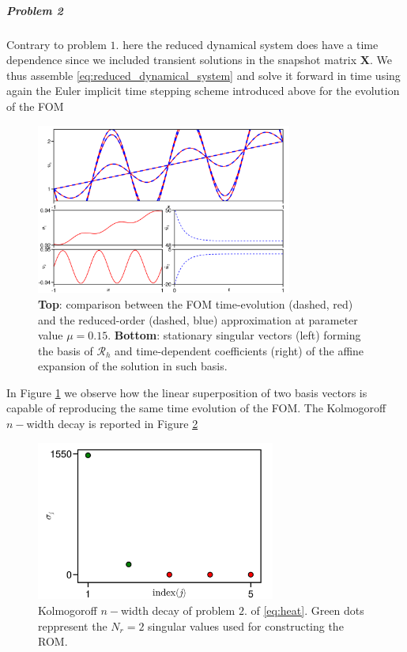 \documentclass[../main.tex]{subfiles}
\begin{document}
\subparagraph{Problem 2}\label{subpar:problem2_rom}

Contrary to problem $1.$ here the reduced dynamical system does have a time dependence since we included transient solutions in the snapshot matrix $\boldsymbol{X}$.
We thus assemble \eqref{eq:reduced_dynamical_system} and solve it forward in time using again the Euler implicit time stepping scheme introduced above for the evolution of the FOM

\begin{figure}[H]
    \centering 
    \includegraphics[keepaspectratio, width=0.75\textwidth]{../figures/fig:problem2_rom.png}
    \caption{\textbf{Top}: comparison between the FOM time-evolution (dashed, red) and the reduced-order (dashed, blue) approximation at parameter value $\mu=0.15$.
    \textbf{Bottom}: stationary singular vectors (left) forming the basis of $\mathcal{R}_{h}$ and time-dependent coefficients (right) of the affine expansion of the solution in such basis.}
    \label{fig:problem2_rom}
\end{figure}

In Figure \ref{fig:problem2_rom} we observe how the linear superposition of two basis vectors is capable of reproducing the same time evolution of the FOM.
The Kolmogoroff $n-$width decay is reported in Figure \ref{fig:problem2_decay} 

\begin{figure}[H]
    \centering 
    \includegraphics[keepaspectratio, width=0.7\textwidth]{../figures/fig:problem2_decay.png}
    \caption{Kolmogoroff $n-$width decay of problem $2.$ of \eqref{eq:heat}. Green dots reppresent the $N_{r}=2$ singular values used for constructing the ROM.}
    \label{fig:problem2_decay}
\end{figure}
\end{document}
